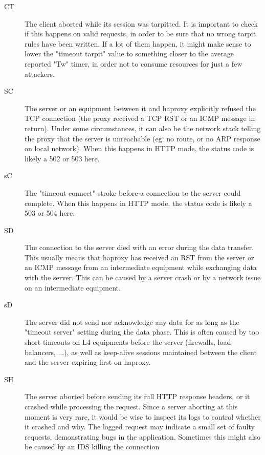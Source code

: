 \begin{description}
     \item[CT]
          The client aborted while its session was tarpitted. It is important to
          check if this happens on valid requests, in order to be sure that no
          wrong tarpit rules have been written. If a lot of them happen, it
          might make sense to lower the "timeout tarpit" value to something
          closer to the average reported "Tw" timer, in order not to consume
          resources for just a few attackers.
     \item[SC]
          The server or an equipment between it and haproxy explicitly refused
          the TCP connection (the proxy received a TCP RST or an ICMP message
          in return). Under some circumstances, it can also be the network
          stack telling the proxy that the server is unreachable (eg: no route,
          or no ARP response on local network). When this happens in HTTP mode,
          the status code is likely a 502 or 503 here.
     \item[sC]
          The "timeout connect" stroke before a connection to the server could
          complete. When this happens in HTTP mode, the status code is likely a
          503 or 504 here.
     \item[SD]
          The connection to the server died with an error during the data
          transfer. This usually means that haproxy has received an RST from
          the server or an ICMP message from an intermediate equipment while
          exchanging data with the server. This can be caused by a server crash
          or by a network issue on an intermediate equipment.
     \item[sD]
          The server did not send nor acknowledge any data for as long as the
          "timeout server" setting during the data phase. This is often caused
          by too short timeouts on L4 equipments before the server (firewalls,
          load-balancers, ...), as well as keep-alive sessions maintained
          between the client and the server expiring first on haproxy.
     \item[SH]
          The server aborted before sending its full HTTP response headers, or
          it crashed while processing the request. Since a server aborting at
          this moment is very rare, it would be wise to inspect its logs to
          control whether it crashed and why. The logged request may indicate a
          small set of faulty requests, demonstrating bugs in the application.
          Sometimes this might also be caused by an IDS killing the connection

\end{description}
